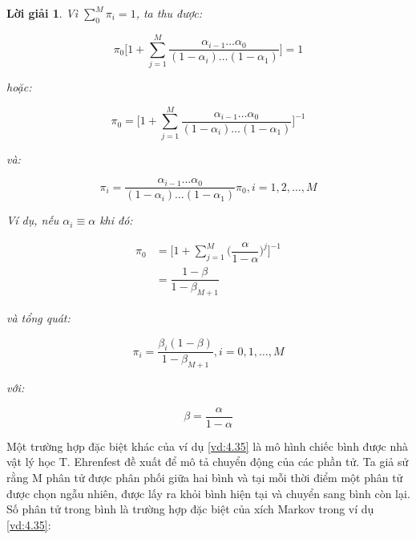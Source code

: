 \documentclass[14pt, a4paper]{article}
\numberwithin{equation}{section}
\numberwithin{figure}{section}
\theoremstyle{sltheorem}
\theoremstyle{soltheorem}
\newtheorem*{loigiai}{Lời giải}
\numberwithin{dl}{section}
\numberwithin{md}{section}
\numberwithin{vd}{section}
\begin{document}
\begin{loigiai}
        Vì $\sum_{0}^M \pi_i = 1$, ta thu được:

        \begin{equation*}
            \pi_0 \Bigg \lbrack 1 + \sum_{j=1}^M \dfrac{\alpha_{i-1}\dots \alpha_0}{(1-\alpha_i)\dots(1-\alpha_1)}  \Bigg \rbrack = 1
        \end{equation*}

        hoặc:

        \begin{equation} \label{eq:4.23}
            \pi_0 = \Bigg \lbrack 1 + \sum_{j=1}^M \dfrac{\alpha_{i-1}\dots \alpha_0}{(1-\alpha_i)\dots(1-\alpha_1)}  \Bigg \rbrack^{-1}
        \end{equation}

        và:

        \begin{equation} \label{eq:4.24}
            \pi_i = \dfrac{\alpha_{i-1}\dots \alpha_0}{(1-\alpha_i)\dots(1-\alpha_1)} \pi_0, i = 1, 2, \dots, M
        \end{equation}

        Ví dụ, nếu $\alpha_i \equiv \alpha $ khi đó:

        \begin{equation*}
            \begin{aligned}
                \pi_0 &= \Bigg \lbrack 1 + \sum_{j=1}^M \Big ( \dfrac{\alpha}{1-\alpha} \Big)^j \Bigg \rbrack^{-1} \\
                &= \dfrac{1-\beta}{1-\beta_{M+1}}
            \end{aligned}
        \end{equation*}

        và tổng quát:

        \begin{equation*}
            \pi_i = \dfrac{\beta_i (1 - \beta)}{1 - \beta_{M+1}}, i = 0, 1 , \dots, M
        \end{equation*}

        với:

        \begin{equation*}
            \beta = \dfrac{\alpha}{1 - \alpha}
        \end{equation*}
    \end{loigiai}

    Một trường hợp đặc biệt khác của ví dụ \ref{vd:4.35} là mô hình chiếc bình được nhà vật lý học T. Ehrenfest đề xuất để mô tả chuyển động của các phần tử.
    Ta giả sử rằng M phân tử được phân phối giữa hai bình và tại mỗi thời điểm một phân tử được chọn ngẫu nhiên, được lấy ra khỏi bình hiện tại và chuyển sang bình còn lại.
    Số phân tử trong bình là trường hợp đặc biệt của xích Markov trong ví dụ \ref{vd:4.35}:
\end{document}
